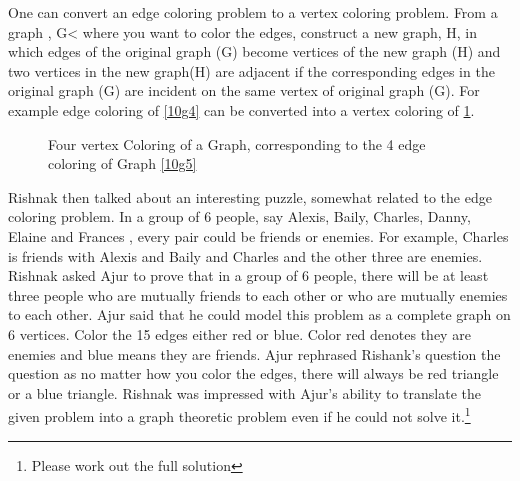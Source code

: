 One can convert an edge coloring problem to a vertex coloring problem. From a graph , G< where you want to color the edges, construct a new graph, H, in which edges of the original graph (G) become vertices of the new graph (H) and two vertices in the new graph(H) are adjacent if the corresponding edges in the original graph (G) are incident on the same vertex of original graph (G).
For example edge coloring of \ref{10g4} can be converted into a vertex coloring of \ref{10g45}.
\begin{figure}
\begin{center}


\caption{Four vertex Coloring of a Graph, corresponding to the 4 edge coloring of Graph \ref{10g5}}\label{10g45}
\end{center}
\end{figure}


Rishnak then talked about an interesting puzzle, somewhat related to the edge coloring problem. In a group of 6 people, say Alexis, Baily, Charles, Danny, Elaine and Frances , every pair could be friends or enemies. For example, Charles is friends with Alexis and Baily and Charles and the other three are enemies. Rishnak asked Ajur to prove that in a group of 6 people, there will be at least three people who are mutually friends to each other or who are mutually enemies to each other. Ajur said that he could model this problem as a complete graph on 6 vertices. Color the 15 edges either red or blue. Color red denotes they are enemies and blue means they are friends. Ajur rephrased Rishank's question the question as no matter how you color the edges, there will always be red triangle or a blue triangle. Rishnak was impressed with Ajur's ability to translate the given problem into a graph theoretic problem even if he could not solve it.\footnote{Please work out the full solution}


